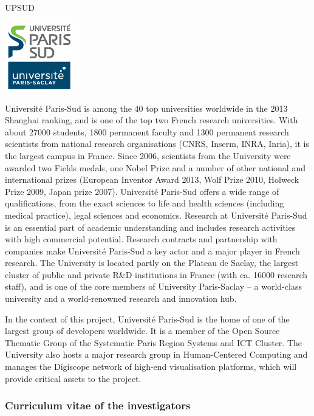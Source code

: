 \begin{sitedescription}{UPSUD} \label{desc:ParisSud}

\begin{center}
\includegraphics[height=3cm]{Participants/Logos/UPSud.png}
\end{center}

Université Paris-Sud is among the 40 top universities worldwide in the
2013 Shanghai ranking, and is one of the top two French research
universities. With about 27000 students, 1800 permanent faculty
and 1300 permanent research scientists from national research
organisations (CNRS, Inserm, INRA, Inria), it is the largest campus in
France. Since 2006, scientists from the University were awarded two
Fields medals, one Nobel Prize and a number of other national and international prizes
(European Inventor Award 2013, Wolf Prize 2010, Holweck Prize 2009,
Japan prize 2007).  Université Paris-Sud offers a
wide range of qualifications, from the exact sciences to life and health
sciences (including medical practice), legal sciences and economics. 
Research at Université Paris-Sud is an essential part of academic understanding 
and includes research activities with high commercial potential. 
Research contracts and partnership with companies make
Université Paris-Sud a key actor and a major player in French
research.  The University is located partly on the Plateau de Saclay,
the largest cluster of public and private R\&D institutions in France
(with ca. 16000 research staff), and is one of the core members of 
University Paris-Saclay – a world-class university and a
world-renowned research and innovation hub.

In the context of this project, Université Paris-Sud is the
home of one of the largest group of \Sage developers worldwide.
It is a member of the Open Source Thematic Group of the Systematic
Paris Region Systems and ICT Cluster. 
The University also hosts a major research group in Human-Centered Computing
and manages the Digiscope network of high-end visualisation platforms,
which will provide critical assets to the project.

\subsubsection*{Curriculum vitae of the investigators}


\end{sitedescription}
